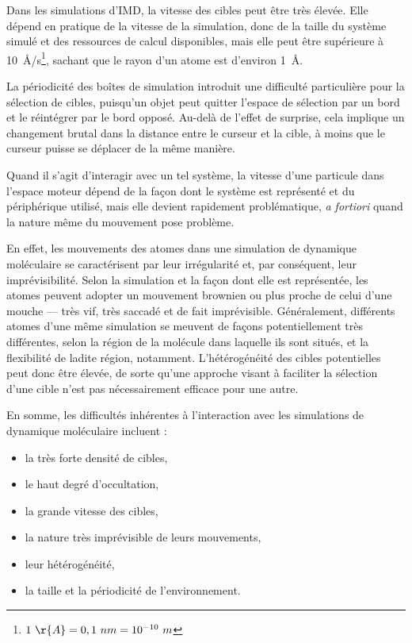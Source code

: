	
	Dans les simulations d'IMD, la vitesse des cibles peut être très élevée. Elle dépend en pratique de la vitesse de la simulation, donc de la taille du système simulé et des ressources de calcul disponibles, mais elle peut être supérieure à 10~\r{A}/s\footnote{$1~\r{A} = 0,1~nm = 10^{-10}~m $}, sachant que le rayon d'un atome est d'environ 1~\r{A}.
	
	La périodicité des \og boîtes \fg{} de simulation introduit une difficulté particulière pour la sélection de cibles, puisqu'un objet peut quitter l'espace de sélection par un bord et le réintégrer par le bord opposé. Au-delà de l'effet de surprise, cela implique un changement brutal dans la distance entre le curseur et la cible, à moins que le curseur puisse se déplacer de la même manière.
	
	Quand il s'agit d'interagir avec un tel système, la vitesse d'une particule dans l'espace moteur dépend de la façon dont le système est représenté et du périphérique utilisé, mais elle devient rapidement problématique, \emph{a fortiori} quand la nature même du mouvement pose problème.
	
	En effet, les mouvements des atomes dans une simulation de dynamique moléculaire se caractérisent par leur irrégularité et, par conséquent, leur imprévisibilité. Selon la simulation et la façon dont elle est représentée, les atomes peuvent adopter un mouvement brownien ou plus proche de celui d'une mouche --- très vif, très saccadé et de fait imprévisible. Généralement, différents atomes d'une même simulation se meuvent de façons potentiellement très différentes, selon la région de la molécule dans laquelle ils sont situés, et la flexibilité de ladite région, notamment. L'hétérogénéité des cibles potentielles peut donc être élevée, de sorte qu'une approche visant à faciliter la sélection d'une cible n'est pas nécessairement efficace pour une autre.
	
	En somme, les difficultés inhérentes à l'interaction avec les simulations de dynamique moléculaire incluent :
	
	\begin{itemize}
		\item la très forte densité de cibles,
		\item le haut degré d'occultation,
		\item la grande vitesse des cibles,
		\item la nature très imprévisible de leurs mouvements,
		\item leur hétérogénéité,
		\item la taille et la périodicité de l'environnement.
	\end{itemize}
	
